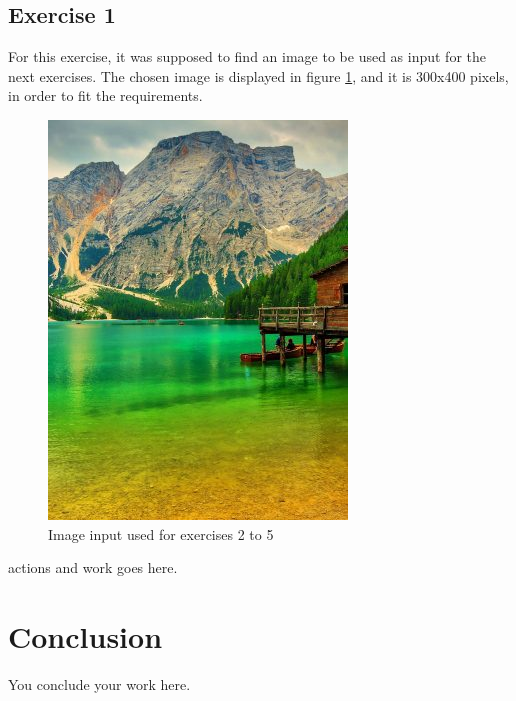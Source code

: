 \documentclass[]{IEEEtran}
\begin{document}
  \subsection{Exercise 1}
  For this exercise, it was supposed to find an image to be used as input for the next exercises. The chosen image is displayed in figure \ref{fig:i-1-0}, and it is 300x400 pixels, in order to fit the requirements.
  \begin{figure}[!h]
    \centering
    \includegraphics{../input/i-1-0.jpg}
    \caption{Image input used for exercises 2 to 5}
    \label{fig:i-1-0}
  \end{figure}

  actions and work goes here.
  
  \section{Conclusion}
  
  You conclude your work here.
  
\end{document}
